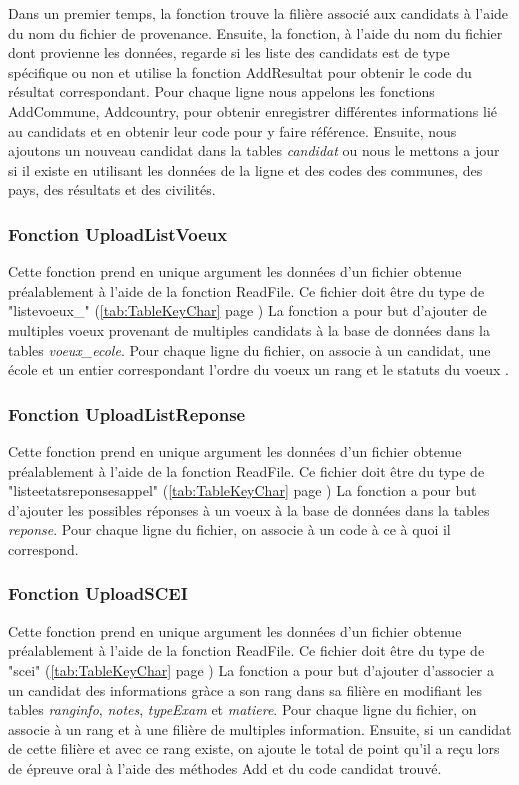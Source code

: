 Dans un premier temps, la fonction trouve la filière associé aux candidats à l'aide du nom du fichier de provenance.
Ensuite, la fonction, à l'aide du nom du fichier dont provienne les données, regarde si les liste des candidats est de type spécifique ou non et utilise la fonction AddResultat pour obtenir le code du résultat correspondant.
Pour chaque ligne nous appelons les fonctions AddCommune, Addcountry, pour obtenir enregistrer différentes informations lié au candidats et en obtenir leur code pour y faire référence.
Ensuite, nous ajoutons un nouveau candidat dans la tables \textit{candidat} ou nous le mettons a jour si il existe en utilisant les données de la ligne et des codes des communes, des pays, des résultats et des civilités.

\subsubsection{Fonction UploadListVoeux}


Cette fonction prend en unique argument les données d'un fichier obtenue préalablement à l'aide de la fonction ReadFile. Ce fichier doit être du type de "listevoeux\_" (\ref{tab:TableKeyChar} page \pageref{tab:TableKeyChar})
La fonction a pour but d'ajouter de multiples voeux provenant de multiples candidats à la base de données dans la tables \textit{voeux\_ecole}.
Pour chaque ligne du fichier, on associe à un candidat, une école et un entier correspondant l'ordre du voeux un rang et le statuts du voeux .

\subsubsection{Fonction UploadListReponse}


Cette fonction prend en unique argument les données d'un fichier obtenue préalablement à l'aide de la fonction ReadFile. Ce fichier doit être du type de "listeetatsreponsesappel" (\ref{tab:TableKeyChar} page \pageref{tab:TableKeyChar})
La fonction a pour but d'ajouter les possibles réponses à un voeux à la base de données dans la tables \textit{reponse}.
Pour chaque ligne du fichier, on associe à un code à ce à quoi il correspond.


\subsubsection{Fonction UploadSCEI}


Cette fonction prend en unique argument les données d'un fichier obtenue préalablement à l'aide de la fonction ReadFile. Ce fichier doit être du type de "scei" (\ref{tab:TableKeyChar} page \pageref{tab:TableKeyChar})
La fonction a pour but d'ajouter d'associer a un candidat des informations gràce a son rang dans sa filière en modifiant les tables \textit{ranginfo}, \textit{notes}, \textit{typeExam} et \textit{matiere}.
Pour chaque ligne du fichier, on associe à un rang et à une filière de multiples information. Ensuite, si un candidat de cette filière et avec ce rang existe, on ajoute le total de point qu'il a reçu lors de épreuve oral à l'aide des méthodes Add et du code candidat trouvé.


